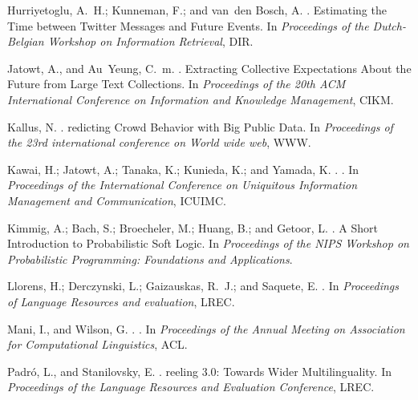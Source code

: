 \documentclass[letterpaper]{article}
\begin{document}
\begin{thebibliography}{}
Hurriyetoglu, A.~H.; Kunneman, F.; and van~den Bosch, A.
.
\newblock Estimating the {T}ime between {T}witter {M}essages and {F}uture
  {E}vents.
\newblock In {\em Proceedings of the Dutch-Belgian Workshop on Information
  Retrieval}, DIR.

Jatowt, A., and Au~Yeung, C.~m.
.
\newblock Extracting {C}ollective {E}xpectations {A}bout the {F}uture from
  {L}arge {T}ext {C}ollections.
\newblock In {\em Proceedings of the 20th ACM International Conference on
  Information and Knowledge Management}, CIKM.

Kallus, N.
.
redicting {C}rowd {B}ehavior with {B}ig {P}ublic {D}ata.
\newblock In {\em Proceedings of the 23rd international conference on World
  wide web}, WWW.

Kawai, H.; Jatowt, A.; Tanaka, K.; Kunieda, K.; and Yamada, K.
.
.
\newblock In {\em Proceedings of the International Conference on Uniquitous
  Information Management and Communication}, ICUIMC.

Kimmig, A.; Bach, S.; Broecheler, M.; Huang, B.; and Getoor, L.
.
\newblock A {S}hort {I}ntroduction to {P}robabilistic {S}oft {L}ogic.
\newblock In {\em Proceedings of the NIPS Workshop on Probabilistic
  Programming: Foundations and Applications}.

Llorens, H.; Derczynski, L.; Gaizauskas, R.~J.; and Saquete, E.
.
\newblock In {\em Proceedings of Language Resources and evaluation}, LREC.

Mani, I., and Wilson, G.
.
.
\newblock In {\em Proceedings of the Annual Meeting on Association for
  Computational Linguistics}, ACL.

Padró, L., and Stanilovsky, E.
.
reeling 3.0: {T}owards {W}ider {M}ultilinguality.
\newblock In {\em Proceedings of the Language Resources and Evaluation
  Conference}, LREC.


\end{thebibliography}
\end{document}
